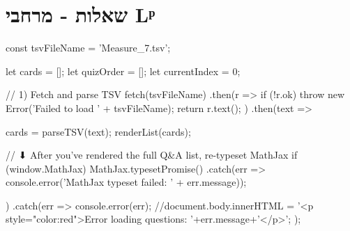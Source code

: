\documentclass{tstextbook}
\begin{document}
  \section{שאלות - מרחבי Lᵖ}


    const tsvFileName = 'Measure_7.tsv';

    let cards = [];
    let quizOrder = [];
    let currentIndex = 0;

    // 1) Fetch and parse TSV
fetch(tsvFileName)
  .then(r => {
    if (!r.ok) throw new Error('Failed to load ' + tsvFileName);
    return r.text();
  })
  .then(text => {
    cards = parseTSV(text);
    renderList(cards);

    // ⬇ After you’ve rendered the full Q&A list, re-typeset MathJax
    if (window.MathJax) {
      MathJax.typesetPromise()
        .catch(err => console.error('MathJax typeset failed: ' + err.message));
    }
  })
  .catch(err => {
    console.error(err);
    //document.body.innerHTML =  '<p style="color:red">Error loading questions: '+err.message+'</p>';
  });
\end{document}
